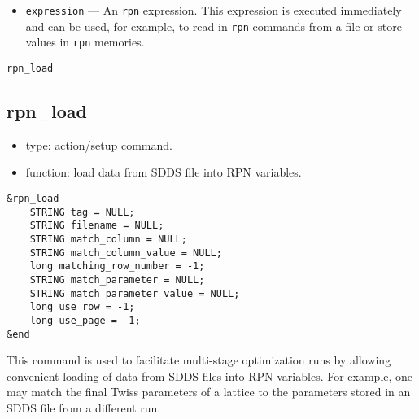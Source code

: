 \documentclass[11pt]{article}
\begin{document}
\begin{itemize}
\item \verb|expression| --- An {\tt rpn} expression.  This expression is executed immediately and can be
used, for example, to read in {\tt rpn} commands from a file or store values in {\tt rpn} memories.
\end{itemize}

\begin{latexonly}
\newpage
\begin{center}{\Large\verb|rpn_load|}\end{center}
\end{latexonly}
\subsection{rpn\_load \label{subsec:rpnload}}

\begin{itemize}
\item type: action/setup command.
\item function: load data from SDDS file into RPN variables.
\end{itemize}

\begin{verbatim}
&rpn_load
    STRING tag = NULL;
    STRING filename = NULL;
    STRING match_column = NULL;
    STRING match_column_value = NULL;
    long matching_row_number = -1;
    STRING match_parameter = NULL;
    STRING match_parameter_value = NULL;
    long use_row = -1;
    long use_page = -1;
&end
\end{verbatim}

This command is used to facilitate multi-stage optimization runs by allowing convenient
loading of data from SDDS files into RPN variables.  For example, one may match the
final Twiss parameters of a lattice to the parameters stored in an SDDS file from
a different run.
\end{document}
